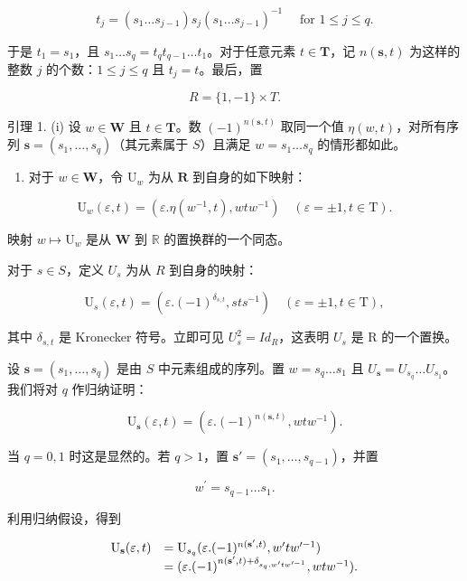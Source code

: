 \[
t _ {j} = \left(s _ {1} \dots s _ {j - 1}\right) s _ {j} \left(s _ {1} \dots s _ {j - 1}\right) ^ {- 1} \quad \text { for } 1 \leqslant j \leqslant q.\tag{11}
\]

于是 \(t_1 = s_1\)，且 \(s_1 \ldots s_q = t_q t_{q-1} \ldots t_1\)。对于任意元素 \(t \in \mathbf{T}\)，记 \(n(\mathbf{s}, t)\) 为这样的整数 \(j\) 的个数：\(1 \leqslant j \leqslant q\) 且 \(t_j = t\)。最后，置

\[
R = \{1, - 1 \} \times T.
\]

引理 1. (i) 设 \(w \in \mathbf{W}\) 且 \(t \in \mathbf{T}\)。数 \((-1)^{n(\mathbf{s},t)}\) 取同一个值 \(\eta(w,t)\)，对所有序列 \(\mathbf{s} = (s_1, \ldots, s_q)\)（其元素属于 \(S\)）且满足 \(w = s_1 \ldots s_q\) 的情形都如此。

\begin{enumerate}
\def\labelenumi{(\roman{enumi})}
\setcounter{enumi}{1}
\tightlist
\item
  对于 \(w \in \mathbf{W}\)，令 \(\mathrm{U}_w\) 为从 \(\mathbf{R}\) 到自身的如下映射：
\end{enumerate}

\[
\mathrm{U} _ {w} (\varepsilon , t) = (\varepsilon . \eta (w ^ {- 1}, t), w t w ^ {- 1}) \quad (\varepsilon = \pm 1, t \in \mathrm{T}).\tag{12}
\]

映射 \(w \mapsto \mathrm{U}_w\) 是从 \(\mathbf{W}\) 到 \(\mathbb{R}\) 的置换群的一个同态。

对于 \(s \in S\)，定义 \(U_s\) 为从 \(R\) 到自身的映射：

\[
\mathrm{U} _ {s} (\varepsilon , t) = \left(\varepsilon . (- 1) ^ {\delta_ {s, t}}, s t s ^ {- 1}\right) \quad (\varepsilon = \pm 1, t \in \mathrm{T}),\tag{13}
\]

其中 \(\delta_{s,t}\) 是 Kronecker 符号。立即可见 \(U_{s}^{2} = Id_{R}\)，这表明 \(U_{s}\) 是 R 的一个置换。

设 \(\mathbf{s} = (s_1, \ldots, s_q)\) 是由 \(S\) 中元素组成的序列。置 \(w = s_q \ldots s_1\) 且 \(U_{\mathbf{s}} = U_{s_q} \ldots U_{s_1}\)。我们将对 \(q\) 作归纳证明：

\[
\mathrm{U} _ {\mathbf {s}} (\varepsilon , t) = (\varepsilon . (- 1) ^ {n (\mathbf {s}, t)}, w t w ^ {- 1}).\tag{14}
\]

当 \(q = 0,1\) 时这是显然的。若 \(q > 1\)，置 \(\mathbf{s}' = (s_1,\dots ,s_{q - 1})\)，并置

\[
w ^ {\prime} = s _ {q - 1} \dots s _ {1}.
\]

利用归纳假设，得到

\[
\begin{array}{r l} \mathrm{U} _ {\mathbf {s}} (\varepsilon , t) & = \mathrm{U} _ {s _ {q}} (\varepsilon . (- 1) ^ {n (\mathbf {s} ^ {\prime}, t)}, w ^ {\prime} t w ^ {\prime - 1}) \\ & = (\varepsilon . (- 1) ^ {n (\mathbf {s} ^ {\prime}, t) + \delta_ {s _ {q}, w ^ {\prime} t w ^ {\prime - 1}}}, w t w ^ {- 1}). \end{array}
\]

